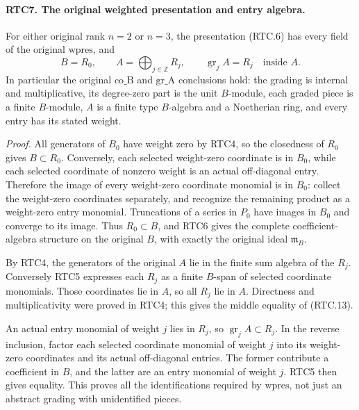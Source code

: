 \documentclass[11pt,a4paper]{article}
\numberwithin{equation}{section}
\theoremstyle{remark}\newtheorem{remark}[theorem]{Remark}
\begin{document}
\paragraph{RTC7. The original weighted presentation and entry algebra.}
\label{claim:RTC7}
For either original rank \(n=2\) or \(n=3\), the presentation
(RTC.6) has every field of the original \(\mathrm{wpres}\), and
\[
 B=R_0,\qquad A=\bigoplus_{j\in\mathbb Z}R_j,
       \qquad \operatorname{gr}_jA=R_j\quad\text{inside }A.
                                                        \tag{RTC.13}
\]
In particular the original \(\mathrm{co\_\allowbreak B}\) and
\(\mathrm{gr\_\allowbreak A}\) conclusions hold: the grading is internal
and multiplicative, its degree-zero part is the unit \(B\)-module,
each graded piece is a finite \(B\)-module, \(A\) is a finite
type \(B\)-algebra and a Noetherian ring, and every entry has
its stated weight.

\emph{Proof.}
All generators of \(B_0\) have weight zero by RTC4, so the
closedness of \(R_0\) gives \(B\subset R_0\).  Conversely,
each selected weight-zero coordinate is in \(B_0\), while each
selected coordinate of nonzero weight is an actual off-diagonal
entry.  Therefore the image of every weight-zero coordinate monomial
is in \(B_0\): collect the weight-zero coordinates separately,
and recognize the remaining product as a weight-zero entry monomial.
Truncations of a series in \(P_0\) have images in \(B_0\) and
converge to its image.  Thus \(R_0\subset B\), and RTC6 gives
the complete coefficient-algebra structure on the original \(B\),
with exactly the original ideal \(\mathfrak m_B\).

By RTC4, the generators of the original \(A\) lie in the finite
sum algebra of the \(R_j\).  Conversely RTC5 expresses each
\(R_j\) as a finite \(B\)-span of selected coordinate monomials.
Those coordinates lie in \(A\), so all \(R_j\) lie in \(A\).
Directness and multiplicativity were proved in RTC4; this gives
the middle equality of (RTC.13).

An actual entry monomial of weight \(j\) lies in \(R_j\), so
\(\operatorname{gr}_jA\subset R_j\).  In the reverse inclusion,
factor each selected coordinate monomial of weight \(j\) into
its weight-zero coordinates and its actual off-diagonal entries.
The former contribute a coefficient in \(B\), and the latter
are an entry monomial of weight \(j\).  RTC5 then gives equality.
This proves all the identifications required by \(\mathrm{wpres}\),
not just an abstract grading with unidentified pieces.
\end{document}
